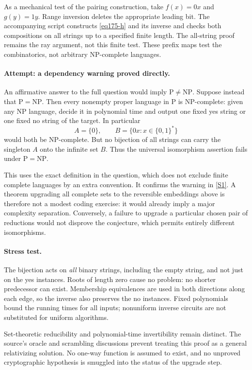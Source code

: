 \documentclass[11pt,a4paper]{article}
\newcommand{\sref}[2]{\hyperlink{source:#1:#2}{[S#2]}}
\numberwithin{equation}{section}
\begin{document}
As a mechanical test of the pairing construction, take $f(x)=0x$ and
$g(y)=1y$. Range inversion deletes the appropriate leading bit. The
accompanying script constructs \eqref{eq175-h} and its inverse and checks
both compositions on all strings up to a specified finite length. The
all-string proof remains the ray argument, not this finite test. These
prefix maps test the combinatorics, not arbitrary NP-complete languages.

\paragraph{Attempt: a dependency warning proved directly.}
An affirmative answer to the full question would imply
$\mathrm P\ne\mathrm{NP}$. Suppose instead that $\mathrm P=\mathrm{NP}$.
Then every nonempty proper language in $\mathrm P$ is NP-complete: given
any NP language, decide it in polynomial time and output one fixed yes
string or one fixed no string of the target. In particular
\[
 A=\{0\},\qquad B=\{0x:x\in\{0,1\}^*\}
\]
would both be NP-complete. But no bijection of all strings can carry the
singleton $A$ onto the infinite set $B$. Thus the universal isomorphism
assertion fails under $\mathrm P=\mathrm{NP}$.

This uses the exact definition in the question, which does not exclude
finite complete languages by an extra convention. It confirms the
warning in \sref{30006769}{1}. A theorem upgrading all complete sets to the
reversible embeddings above is therefore not a modest coding exercise:
it would already imply a major complexity separation. Conversely, a
failure to upgrade a particular chosen pair of reductions would not
disprove the conjecture, which permits entirely different isomorphisms.

\paragraph{Stress test.}
The bijection acts on \emph{all} binary strings, including the empty string,
and not just on the yes instances. Roots of length zero cause no problem:
no shorter predecessor can exist. Membership equivalences are used in
both directions along each edge, so the inverse also preserves the no
instances. Fixed polynomials bound the running times for all inputs;
nonuniform inverse circuits are not substituted for uniform algorithms.

Set-theoretic reducibility and polynomial-time invertibility remain distinct.
The source's oracle and scrambling discussions prevent treating this proof
as a general relativizing solution. No one-way function is assumed to exist,
and no unproved cryptographic hypothesis is smuggled into the status of
the upgrade step.
\end{document}
